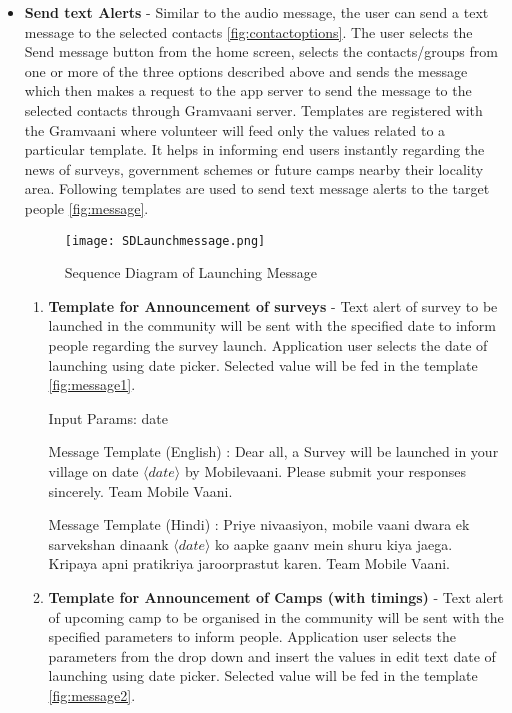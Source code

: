 \begin{itemize}
\item\textbf {Send text Alerts} - Similar to the audio message, the user can
send a text message to the selected contacts \ref{fig:contactoptions}. The user selects the Send
message button from the home screen, selects the contacts/groups from
one or more of the three options described above and sends the message
which then makes a request to the app server to send the message to
the selected contacts through Gramvaani server. Templates are registered with the Gramvaani where volunteer will feed only the values related to a particular template. It helps in informing end users instantly regarding the news of surveys, government schemes or future camps nearby their locality area. Following templates are used to send text message alerts to the target people \ref{fig:message}.

\begin{figure}[H]
    \centering
	\texttt{[image: SDLaunchmessage.png]}
    \caption{ Sequence Diagram of Launching Message}
    \label{fig:Sequence Diagram of Launching Message}
\end{figure}

\begin{enumerate}
\item \textbf {Template for Announcement of surveys} - Text alert of survey to be launched in the community will be sent with the specified date to inform people regarding the survey launch. Application user selects the date of launching using date picker. Selected value will be fed in the template \ref{fig:message1}.

Input Params: date 

Message Template (English) : Dear all, a Survey ​will be launched in your village on date $\langle date \rangle$  by Mobilevaani. Please submit your responses sincerely. ​Team Mobile Vaani.
 
Message Template (Hindi) : Priye nivaasiyon​, mobile vaani dwara ​ek sarvekshan dinaank $\langle date\rangle$  ko ​aapke​ gaanv mein shuru kiya jaega. Kripaya apni pratikriya ​jaroor​  prastut karen. Team Mobile Vaani.

\item \textbf {Template for Announcement of Camps (with timings)} - Text alert of upcoming camp to be organised in the community will be sent with the specified parameters to inform people. Application user selects the parameters from the drop down and insert the values in edit text date of launching using date picker. Selected value will be fed in the template \ref{fig:message2}.


\end{enumerate}
\end{itemize}
